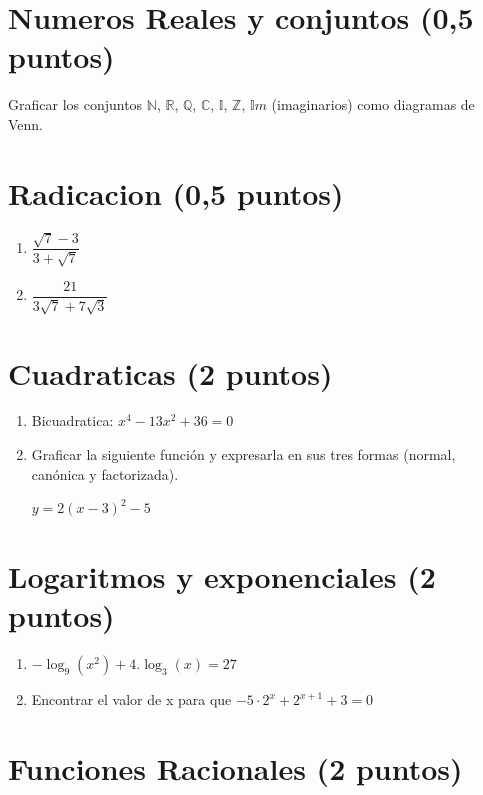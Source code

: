\documentclass[a4paper,11pt,spanish,sans]{exam}
\begin{document}
\section{Numeros Reales y conjuntos (0,5 puntos) }
Graficar los conjuntos $\mathbb{N}$, $\mathbb{R}$, $\mathbb{Q}$, $\mathbb{C}$, $\mathbb{I}$, $\mathbb{Z}$, $\mathbb{I}m$ (imaginarios) como diagramas de Venn.

\section{Radicacion (0,5 puntos)}

\begin{enumerate}
	\item $\dfrac{\sqrt{7}-3}{3+\sqrt{7}}$
	\item $\dfrac{21}{3\sqrt{7}+7\sqrt{3}}$
\end{enumerate}

\section{Cuadraticas (2 puntos)}
\begin{enumerate}
	\item Bicuadratica: $x^4-13x^2+36=0$
	\item Graficar la siguiente función y expresarla en sus tres formas (normal, canónica y factorizada).
	
	$y=2(x-3)^2-5 $
\end{enumerate}

\section{Logaritmos y exponenciales (2 puntos)}
\begin{enumerate}
	
	\item $-\log_9(x^2)+4.\log_3(x)=27$
	
	\item Encontrar el valor de x para que $-5\cdot2^x+2^{x+1}+3=0$
	
\end{enumerate}


\section{Funciones Racionales (2 puntos)}
\end{document}
